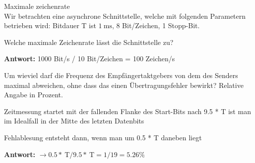 \begin{example}{Maximale zeichenrate}\\
Wir betrachten eine asynchrone Schnittstelle, welche mit folgenden Parametern betrieben wird: Bitdauer T ist $1 \mathrm{~ms}$, 8 Bit/Zeichen, 1 Stopp-Bit.

Welche maximale Zeichenrate lässt die Schnittstelle zu?

\textbf{Antwort:}
1000 Bit/s / 10 Bit/Zeichen = 100 Zeichen/s

Um wieviel darf die Frequenz des Empfängertaktgebers von dem des Senders maximal abweichen, ohne dass das einen Übertragungsfehler bewirkt? Relative Angabe in Prozent.

Zeitmessung startet mit der fallenden Flanke des Start-Bits nach 9.5 * T ist man im Idealfall in der Mitte des letzten Datenbits

Fehlablesung entsteht dann, wenn man um 0.5 * T daneben liegt

\textbf{Antwort:}
$\rightarrow 0.5 * \mathrm{~T} / 9.5 * \mathrm{~T}=1 / 19=5.26 \%$
\end{example}

